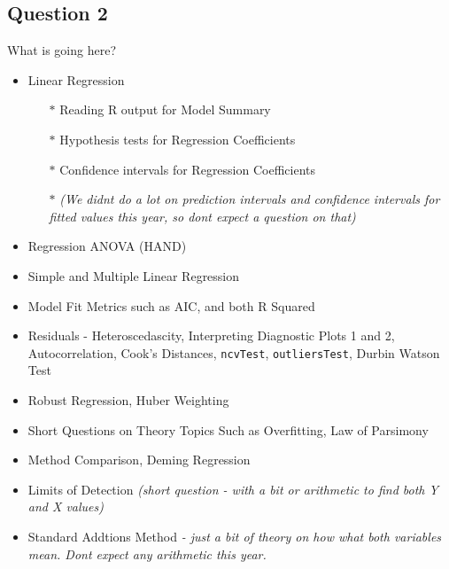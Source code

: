 \documentclass[a4paper,12pt]{article}
\begin{document}
\subsection*{Question 2}
\begin{framed}
	What is going here?
	\begin{itemize}
		\item Linear Regression
		\begin{itemize}
			\item[$\ast$]  Reading R output for Model Summary
			\item[$\ast$]  Hypothesis tests for Regression Coefficients
			\item[$\ast$]  Confidence intervals for Regression Coefficients 
			\item[$\ast$] \textit{(We didnt do a lot on prediction intervals and confidence intervals for fitted values this year, so dont expect a question on that)}
		\end{itemize}
		\item Regression ANOVA (HAND)
				\item Simple and Multiple Linear Regression
				\item Model Fit Metrics such as AIC, and both R Squared
				\item Residuals - Heteroscedascity, Interpreting Diagnostic Plots 1 and 2, Autocorrelation,  Cook's Distances, \texttt{ncvTest}, \texttt{outliersTest}, Durbin Watson Test
				\item Robust Regression, Huber Weighting
						\item Short Questions on Theory Topics Such as Overfitting, Law of Parsimony
				\item Method Comparison, Deming Regression
				\item Limits of Detection \textit{(short question - with a bit or arithmetic to find both Y and X values)}
				\item Standard Addtions Method \textit{- just a bit of theory on how what both variables mean. Dont expect any arithmetic this year.}

			

	\end{itemize}
\end{framed}

\newpage
\end{document}
